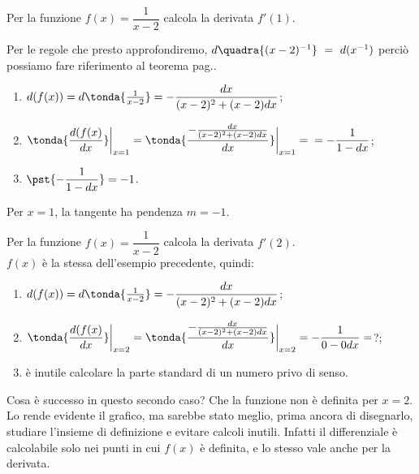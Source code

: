 \begin{esempio}
 Per la funzione $f(x)=\dfrac{1}{x-2}$ calcola la derivata $f'(1)$.\\
\begin{inaccessibleblock}
 \begin{center}
 \begin{minipage}[]{.40 \textwidth}
   \vspace{-.5em}
  \derivaomografica
 \end{minipage} 
 \hfill
 \begin{minipage}[]{.58 \textwidth}
   Per le regole che presto approfondiremo, 
$d\quadra{(x-2)^{-1}}~=~d(x^{-1})$
   perciò possiamo fare riferimento al teorema 
pag.\pageref{subsubsec:diff01_diffrecip}.
\begin{enumerate} [noitemsep]
 \item $d(f(x))=d\tonda {\frac{1}{x-2}}=-\dfrac{dx}{(x-2)^2+(x-2)dx}$;
 \item $\tonda{\dfrac{d(f(x)}{dx}}\bigg|_{x=1}=
  \tonda{\dfrac{-\frac{dx}{(x-2)^2+(x-2)dx}}{dx}}\bigg|_{x=1}=\\ 
  =-\dfrac{1}{1-dx}$;
  \item $\pst{-\dfrac{1}{1-dx}}=-1$.
\end{enumerate}
\end{minipage}
\end{center}
\end{inaccessibleblock}
\label{}
Per $x=1$, la tangente ha pendenza $m=-1$.\\
\end{esempio}

\begin{esempio}
Per la funzione $f(x)=\dfrac{1}{x-2}$ calcola la derivata $f'(2)$.\\
$f(x)$ è la stessa dell'esempio precedente, quindi:
\begin{enumerate} [noitemsep]
 \item $d(f(x))=d\tonda {\frac{1}{x-2}}=-\dfrac{dx}{(x-2)^2+(x-2)dx}$;
 \item $\tonda{\dfrac{d(f(x)}{dx}}\bigg|_{x=2}=
  \tonda{\dfrac{-\frac{dx}{(x-2)^2+(x-2)dx}}{dx}}\bigg|_{x=2} 
  =-\dfrac{1}{0-0dx}=$?;
  \item è inutile calcolare la parte standard di un numero privo di senso.
\end{enumerate}
Cosa è successo in questo secondo caso? Che la funzione non è definita per 
$x=2$.
Lo rende evidente il grafico, ma sarebbe stato meglio, prima ancora di
disegnarlo, studiare l'insieme di definizione e evitare calcoli inutili.
Infatti il differenziale è calcolabile solo nei punti in cui $f(x)$ è
definita, e lo stesso vale anche per la derivata.
\end{esempio}


